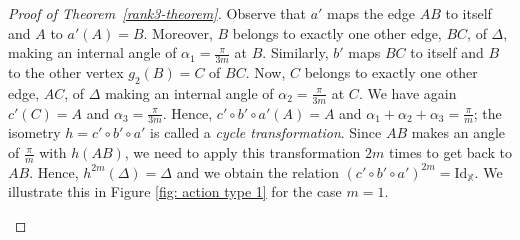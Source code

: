 \documentclass[A4paper, oneside]{amsart}
\newcommand{\id}{\textit{e}}
\newcommand{\X}{\mathbb{X}}
\theoremstyle{definition}
\begin{document}
\begin{proof}[Proof of Theorem~\ref{rank3-theorem}]
Observe that $a'$ maps the edge $AB$ to itself and $A$ to  $a'(A) = B$. Moreover, $B$ belongs to exactly one other edge, $BC$, of $\Delta$, making an internal angle of $\alpha_1 = \frac{\pi}{3m}$ at $B$. Similarly, $b'$  maps $BC$ to itself and $B$ to the other vertex $g_2(B) = C$ of $BC$. Now, $C$ belongs to exactly one other edge, $AC$, of $\Delta$ making an internal angle of $\alpha_2 = \frac{\pi}{3m}$ at $C$.  We have again $c'(C) = A$ and $\alpha_3 = \frac{\pi}{3m}$. Hence, $c' \circ b' \circ a'(A) = A$ and $\alpha_1+\alpha_2+\alpha_3 = \frac{\pi}{m}$; the isometry  $h = c' \circ b' \circ a'$ is called a \emph{cycle transformation}. Since $AB$ makes an angle of $\frac{\pi}{m}$ with $h(AB)$, we need to apply this transformation $2m$ times to get back to $AB$. Hence, $h^{2m}(\Delta) = \Delta$ and we obtain the relation $(c'\circ b'\circ a')^{2m} = \text{Id}_{\X}$. We illustrate this in Figure \ref{fig: action type 1} for the case $m=1$. 


\begin{figure}[h!]
	\centering
	\begin{tikzpicture}[scale=2]
		

\end{tikzpicture}
\end{figure}
\end{proof}
\end{document}
